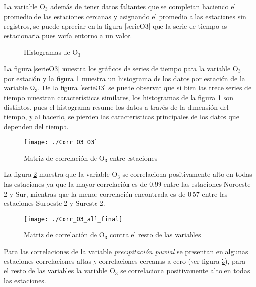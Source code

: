La variable O$_{3}$ además de tener datos faltantes que se completan haciendo el promedio de las estaciones cercanas y asignando el promedio a las estaciones sin registros, se puede apreciar en la figura \ref{serieO3} que la serie de tiempo es estacionaria pues varía entorno a un valor.

\begin{figure}[H]
\centering
{}
\caption{Histogramas de O$_{3}$}
\label{histO3}
\end{figure}

La figura \ref{serieO3} muestra los gráficos de series de tiempo para la variable O$_{3}$ por estación y la figura \ref{histO3} muestra un histograma de los datos por estación de la variable O$_{3}$. De la figura \ref{serieO3} se puede observar que si bien las trece series de tiempo muestran características similares, los histogramas de la figura \ref{histO3} son distintos, pues el histograma resume los datos a través de la dimensión del tiempo, y al hacerlo, se pierden las características principales de los datos que dependen del tiempo.

\begin{figure}[H]
\centering
\texttt{[image: ./Corr\_O3\_O3]}
\caption{Matriz de correlación de O$_{3}$ entre estaciones }
\label{corrO32}
\end{figure}

La figura \ref{corrO32} muestra que la variable O$_{3}$ se correlaciona positivamente alto en todas las estaciones ya que la mayor correlación es de 0.99 entre las estaciones Noroeste 2 y Sur, mientras que la menor correlación encontrada es de 0.57 entre las estaciones Suroeste 2 y Sureste 2.

\begin{figure}[H]
\centering
\texttt{[image: ./Corr\_O3\_all\_final]}
\caption{Matriz de correlación de O$_{3}$ contra el resto de las variables}
\label{corrO3}
\end{figure}

Para las correlaciones de la variable {\em precipitación pluvial} se presentan en algunas estaciones correlaciones altas y correlaciones cercanas a cero (ver figura \ref{corrO3}), para el resto de las variables la variable O$_{3}$ se correlaciona positivamente alto en todas las estaciones.





